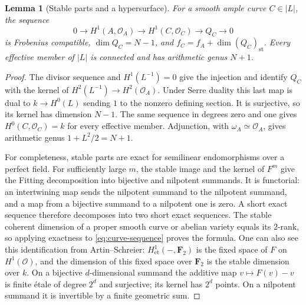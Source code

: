 \documentclass[11pt]{article}
\newtheorem{lemma}[theorem]{Lemma}
\theoremstyle{definition}\newtheorem{definition}[theorem]{Definition}
\theoremstyle{remark}\newtheorem{remark}[theorem]{Remark}
\newcommand{\OO}{\mathcal O}
\newcommand{\FF}{\mathbf F}
\newcommand{\st}{\mathrm{st}}
\begin{document}
\begin{lemma}[Stable parts and a hypersurface]\label{lem:cohomology}
For a smooth ample curve $C\in|L|$, the sequence
\begin{equation}\label{eq:curve-sequence}
 0\longrightarrow H^1(A,\OO_A)\longrightarrow H^1(C,\OO_C)
 \longrightarrow Q_C\longrightarrow0
\end{equation}
is Frobenius compatible, $\dim Q_C=N-1$, and $f_C=f_A+\dim(Q_C)_{\st}$. Every effective member of $|L|$ is connected and has arithmetic genus $N+1$.
\end{lemma}
\begin{proof}
The divisor sequence and $H^1(L^{-1})=0$ give the injection and identify $Q_C$ with the kernel of $H^2(L^{-1})\to H^2(\OO_A)$. Under Serre duality this last map is dual to $k\to H^0(L)$ sending $1$ to the nonzero defining section. It is surjective, so its kernel has dimension $N-1$. The same sequence in degrees zero and one gives $H^0(C,\OO_C)=k$ for every effective member. Adjunction, with $\omega_A\simeq\OO_A$, gives arithmetic genus $1+L^2/2=N+1$.

For completeness, stable parts are exact for semilinear endomorphisms over a perfect field. For sufficiently large $m$, the stable image and the kernel of $F^m$ give the Fitting decomposition into bijective and nilpotent summands. It is functorial: an intertwining map sends the nilpotent summand to the nilpotent summand, and a map from a bijective summand to a nilpotent one is zero. A short exact sequence therefore decomposes into two short exact sequences. The stable coherent dimension of a proper smooth curve or abelian variety equals its $2$-rank, so applying exactness to \eqref{eq:curve-sequence} proves the formula. One can also see this identification from Artin--Schreier: $H^1_{\mathrm{et}}(-,\FF_2)$ is the fixed space of $F$ on $H^1(\OO)$, and the dimension of this fixed space over $\FF_2$ is the stable dimension over $k$. On a bijective $d$-dimensional summand the additive map $v\mapsto F(v)-v$ is finite \'etale of degree $2^d$ and surjective; its kernel has $2^d$ points. On a nilpotent summand it is invertible by a finite geometric sum.
\end{proof}
\end{document}
